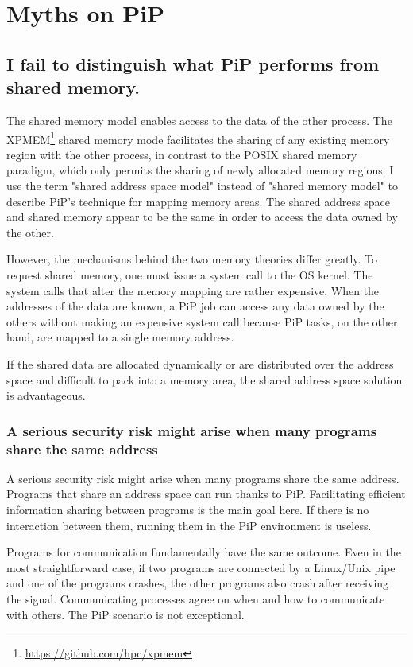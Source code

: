 
\section{Myths on PiP}

\subsection*{I fail to distinguish what PiP performs from shared
  memory.}\label{sec:shared-memory-myth} 

The shared memory model enables access to the data of the other
process. The XPMEM\footnote{\url{https://github.com/hpc/xpmem}} shared
memory mode facilitates the sharing of any 
existing memory region with the other process, in contrast to the
POSIX shared memory paradigm, which only permits the sharing of newly
allocated memory regions. I use the term "shared address space model"
instead of "shared memory model" to describe PiP's technique for
mapping memory areas. The shared address space and shared memory
appear to be the same in order to access the data owned by the other.

However, the mechanisms behind the two memory theories differ
greatly. To request shared memory, one must issue a system call to the
OS kernel. The system calls that alter the memory mapping are rather
expensive. When the addresses of the data are known, a PiP job can
access any data owned by the others without making an expensive system
call because PiP tasks, on the other hand, are mapped to a single
memory address.

If the shared data are allocated dynamically or are distributed over
the address space and difficult to pack into a memory area, the shared
address space solution is advantageous.

\subsubsection*{A serious security risk might arise when many programs
  share the same address}\label{sec:security-issue} 

A serious security risk might arise when many programs share the same address. 
Programs that share an address space can run thanks to
PiP. Facilitating efficient information sharing between programs is
the main goal here. If there is no interaction between them, running
them in the PiP environment is useless.  

Programs for communication fundamentally have the same outcome. Even
in the most straightforward case, if two programs are connected by a
Linux/Unix pipe and one of the programs crashes, the other programs
also crash after receiving the 
signal. Communicating processes agree on when and how to communicate with
others. The PiP scenario is not exceptional.

